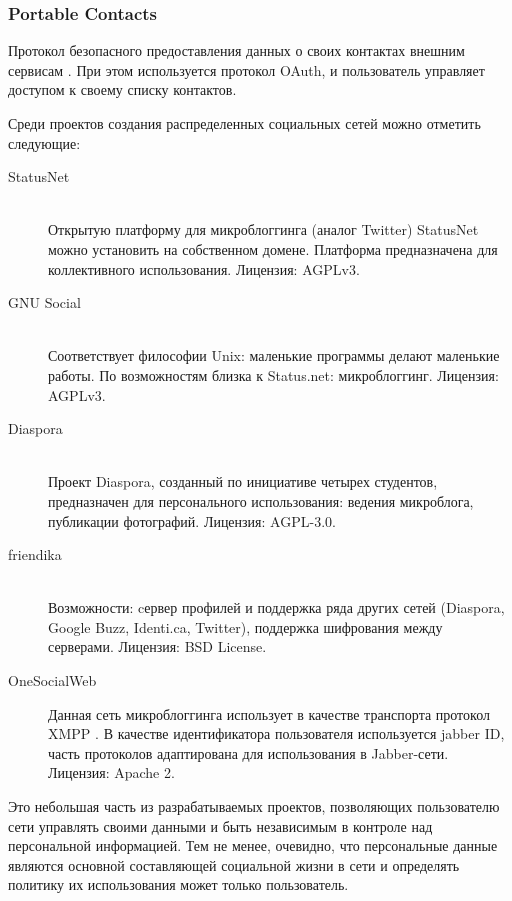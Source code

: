 \documentclass[10pt, a5paper]{article}
\begin{document}
    \subsubsection*{Portable Contacts}
    Протокол безопасного предоставления данных о своих контактах внешним
    сервисам \cite{zag5}. При этом используется протокол OAuth, и
    пользователь управляет доступом к своему списку контактов.

 Среди проектов создания распределенных социальных сетей \linebreak можно отметить
 следующие:
 \begin{description}
	 \item[StatusNet] \cite{zag6}\\
   Открытую платформу для микроблоггинга (аналог Twitter) StatusNet
    можно установить на собственном домене. Платформа предназначена для
    коллективного использования. Лицензия: AGPLv3.
    \item[GNU Social] \cite{zag7}\\
    Соответствует философии Unix: маленькие программы делают маленькие
    работы. По возможностям близка к Status.net: микроблоггинг. Лицензия:
    AGPLv3.
    \item[Diaspora] \cite{zag8}\\
    Проект Diaspora, созданный по инициативе четырех студентов,
    предназначен для персонального использования: ведения микроблога,
    публикации фотографий. Лицензия: AGPL-3.0.
    \item[friendika] \cite{zag9}\\
    Возможности: cервер профилей и поддержка ряда других сетей
    (Diaspora, Google Buzz, Identi.ca, Twitter), поддержка \linebreak шифрования
    между серверами. Лицензия: BSD License.
    \item[OneSocialWeb] \cite{zag10}
    Данная сеть микроблоггинга использует в качестве транспорта протокол
    XMPP \cite{zag11}. В качестве идентификатора пользователя
    используется jabber ID, часть протоколов адаптирована для
    использования в Jabber-сети. Лицензия: Apache 2.
\end{description}
 Это небольшая часть из разрабатываемых проектов, позволяющих
 пользователю сети управлять своими данными и быть независимым в контроле
 над персональной информацией. Тем не менее, очевидно, что персональные
 данные являются основной составляющей социальной жизни в сети и
 определять политику их использования может только пользователь.
\end{document}
